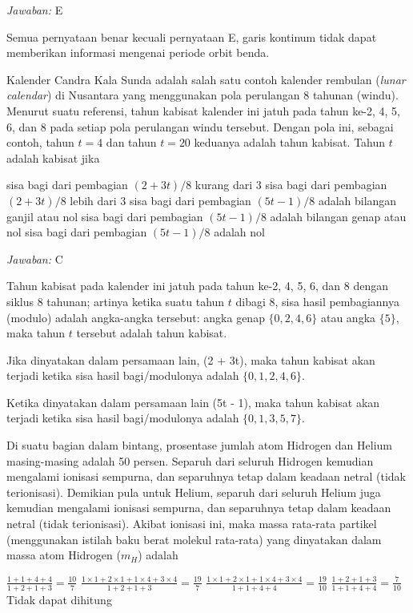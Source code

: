 \documentclass[11pt,fleqn]{exam}
\begin{document}
\begin{questions}
\bigskip
\textit{Jawaban: } E

Semua pernyataan benar kecuali pernyataan E, garis kontinum tidak dapat memberikan informasi mengenai periode orbit benda. 


\vspace{0.5cm}
\question Kalender Candra Kala Sunda adalah salah satu contoh kalender rembulan (\textit{lunar calendar}) di Nusantara yang menggunakan pola perulangan 8 tahunan (windu). Menurut suatu referensi, tahun kabisat kalender ini jatuh pada tahun ke-2, 4, 5, 6, dan 8 pada setiap pola perulangan windu tersebut. Dengan pola ini, sebagai contoh, tahun $t = 4$ dan tahun $t = 20$ keduanya adalah tahun kabisat. Tahun $t$ adalah kabisat jika
\begin{choices}
\choice sisa bagi dari pembagian $(2 + 3t)/8$ kurang dari 3
\choice sisa bagi dari pembagian $(2 + 3t)/8$ lebih dari 3
\choice sisa bagi dari pembagian $(5t - 1)/8$ adalah bilangan ganjil atau nol
\choice sisa bagi dari pembagian $(5t - 1)/8$ adalah bilangan genap atau nol
\choice sisa bagi dari pembagian $(5t - 1)/8$ adalah nol
\end{choices}

\bigskip
\textit{Jawaban: } C

Tahun kabisat pada kalender ini jatuh pada tahun ke-2, 4, 5, 6, dan 8 dengan siklus 8 tahunan; artinya ketika suatu tahun $t$ dibagi 8, sisa hasil pembagiannya  (modulo) adalah angka-angka tersebut: angka genap $\{0, 2, 4, 6 \}$ atau angka $\{5\}$, maka tahun $t$ tersebut adalah tahun kabisat.

Jika dinyatakan dalam persamaan lain, (2 + 3t), maka tahun kabisat akan terjadi ketika sisa hasil bagi/modulonya adalah $\{0, 1, 2, 4, 6\}$. 

Ketika dinyatakan dalam persamaan lain (5t - 1), maka tahun kabisat akan terjadi ketika sisa hasil bagi/modulonya adalah $\{0, 1, 3, 5, 7\}$.


\vspace{0.5cm}
\question Di suatu bagian dalam bintang, prosentase jumlah atom Hidrogen dan Helium masing-masing adalah 50 persen. Separuh dari seluruh Hidrogen kemudian mengalami ionisasi sempurna, dan separuhnya tetap dalam keadaan netral (tidak terionisasi). Demikian pula untuk Helium, separuh dari seluruh Helium juga kemudian mengalami ionisasi sempurna, dan separuhnya tetap dalam keadaan netral (tidak terionisasi). Akibat ionisasi ini, maka massa rata-rata partikel (menggunakan istilah baku berat molekul rata-rata) yang dinyatakan dalam massa atom Hidrogen ($m_H$) adalah
\begin{choices}
\choice $\frac{1+1+4+4}{1+2+1+3} = \frac{10}{7}$
\choice $\frac{1 \times 1 + 2 \times 1 + 1 \times 4 + 3 \times 4}{1+2+1+3} = \frac{19}{7}$
\choice $\frac{1 \times 1 + 2 \times 1 + 1 \times 4 + 3 \times 4}{1+1+4+4} = \frac{19}{10}$
\choice $\frac{1+2+1+3}{1+1+4+4} = \frac{7}{10}$
\choice Tidak dapat dihitung
\end{choices}


\end{questions}
\end{document}

